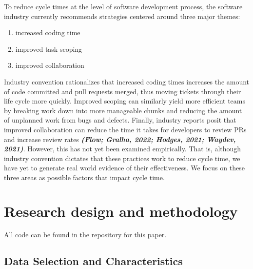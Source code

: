 \documentclass[manuscript,screen,review]{acmart}
\providecommand{\tightlist}{%
  \setlength{\itemsep}{0pt}\setlength{\parskip}{0pt}}\usepackage{longtable,booktabs,array}
\begin{document}
To reduce cycle times at the level of software development process, the
software industry currently recommends strategies centered around three
major themes:

\begin{enumerate}
\def\labelenumi{\arabic{enumi}.}
\tightlist
\item
  increased coding time
\item
  improved task scoping
\item
  improved collaboration
\end{enumerate}

Industry convention rationalizes that increased coding times increases
the amount of code committed and pull requests merged, thus moving
tickets through their life cycle more quickly. Improved scoping can
similarly yield more efficient teams by breaking work down into more
manageable chunks and reducing the amount of unplanned work from bugs
and defects. Finally, industry reports posit that improved collaboration
can reduce the time it takes for developers to review PRs and increase
review rates \textbf{\emph{(Flow; Gralha, 2022; Hodges, 2021; Waydev,
2021)}}. However, this has not yet been examined empirically. That is,
although industry convention dictates that these practices work to
reduce cycle time, we have yet to generate real world evidence of their
effectiveness. We focus on these three areas as possible factors that
impact cycle time.

\section{Research design and
methodology}\label{research-design-and-methodology}

All code can be found in the repository for this paper.

\subsection{Data Selection and
Characteristics}\label{data-selection-and-characteristics}
\end{document}

